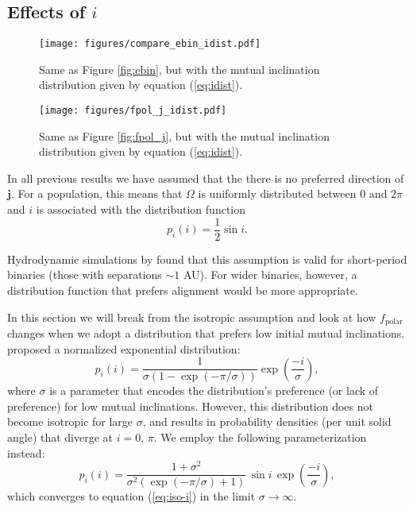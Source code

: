 \documentclass[twocolumn]{aastex631}
\begin{document}
\subsection{Effects of $i$}
\label{subsec:change_i}

\begin{figure*}
    \begin{centering}
        \texttt{[image: figures/compare\_ebin\_idist.pdf]}
        \caption{
            Same as Figure \ref{fig:ebin}, but with the mutual inclination distribution given by equation (\ref{eq:idist}).
        }
        \label{fig:ebin-idist}
    \end{centering}
\end{figure*}

\begin{figure*}
    \begin{centering}
        \texttt{[image: figures/fpol\_j\_idist.pdf]}
        \caption{
            Same as Figure \ref{fig:fpol_j}, but with the mutual inclination distribution given by equation (\ref{eq:idist}).
        }
        \label{fig:fpol_j-idist}
    \end{centering}
\end{figure*}


In all previous results we have assumed that the there is no preferred direction of $\bm{j}$. For a population, this means that $\Omega$ is uniformly distributed between $0$ and $2\pi$ and $i$ is associated with the distribution function
\begin{equation}
    \label{eq:iso-i}
    p_i(i) = \frac{1}{2}\sin{i} .
\end{equation}

Hydrodynamic simulations by \citet{elsender2023} found that this assumption is valid for short-period binaries (those with separations $\sim 1$ AU). For wider binaries, however, a distribution function that prefers alignment would be more appropriate.

In this section we will break from the isotropic assumption and look at how $f_\text{polar}$ changes when we adopt a distribution that prefers low initial mutual inclinations. \citet{ceppi2024} proposed a normalized exponential distribution:
\begin{equation}
    p_i(i) = \frac{1}{\sigma(1-\exp{(-\pi/\sigma)})} \exp{\left(\frac{-i}{\sigma}\right)},
\end{equation}
where $\sigma$ is a parameter that encodes the distribution's preference (or lack of preference) for low mutual inclinations.
However, this distribution does not become isotropic for large $\sigma$, and results in probability densities (per unit solid angle) that diverge at $i=0,\,\pi$. We employ the following parameterization instead:
\begin{equation}
    \label{eq:idist}
    p_i(i) = \frac{1+\sigma^2}{\sigma^2 (\exp{(-\pi/\sigma)}+1)}\,\sin{i}\,\exp{\left(\frac{-i}{\sigma}\right)},
\end{equation}
which converges to equation (\ref{eq:iso-i}) in the limit $\sigma \rightarrow \infty$.
\end{document}
